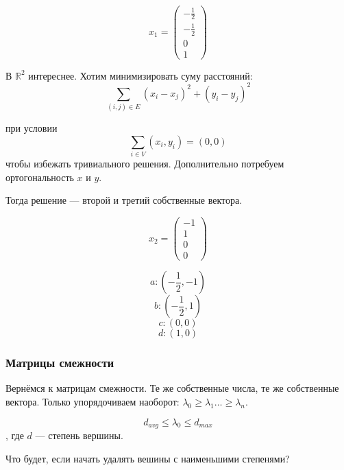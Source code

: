 $$x_1 = \left(\begin{array}{r}-\frac{1}{2}\\-\frac{1}{2}\\0\\1\end{array}\right)$$


В $\mathbb{R}^2$ интереснее. Хотим минимизировать суму расстояний: $$\sum_{(i,j) \in E}(x_i - x_j)^2 + (y_i - y_j)^2$$

при условии $$\sum_{i \in V} (x_i,y_i) = (0,0)$$ чтобы избежать тривиального решения. Дополнительно потребуем ортогональность $x$ и $y$.

Тогда решение --- второй и третий собственные вектора.

$$x_2 = \left(\begin{array}{r}-1\\1\\0\\0\end{array}\right)$$

$$
a: (-\frac{1}{2},-1)
$$
$$
b: (-\frac{1}{2},1)
$$
$$
c: (0,0)
$$
$$
d: (1,0)
$$


\begin{figure}[h]
\begin{center}
\end{center}
\end{figure}


\subsubsection{Матрицы смежности}

Вернёмся к матрицам смежности. Те же собственные числа, те же собственные вектора. Только упорядочиваем наоборот: $\lambda_0 \geq \lambda_1 \ldots \geq \lambda_n$.

\begin{theorem}
$$d_{avg} \leq \lambda_0 \leq d_{max}$$ , где $d$ --- степень вершины.
\end{theorem}

Что будет, если начать удалять вешины с наименьшими степенями?

